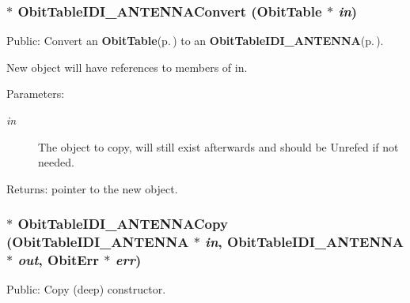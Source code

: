 \subsubsection{$\ast$ Obit\-Table\-IDI\_\-ANTENNAConvert ({\bf Obit\-Table} $\ast$ {\em in})}\label{ObitTableIDI__ANTENNA_8c_a19}


Public: Convert an {\bf Obit\-Table}{\rm (p.\,\pageref{structObitTable})} to an {\bf Obit\-Table\-IDI\_\-ANTENNA}{\rm (p.\,\pageref{structObitTableIDI__ANTENNA})}. 

New object will have references to members of in. \begin{Desc}
\item[Parameters:]
\begin{description}
\item[{\em in}]The object to copy, will still exist afterwards and should be Unrefed if not needed. \end{description}
\end{Desc}
\begin{Desc}
\item[Returns:]pointer to the new object. \end{Desc}
\subsubsection{$\ast$ Obit\-Table\-IDI\_\-ANTENNACopy ({\bf Obit\-Table\-IDI\_\-ANTENNA} $\ast$ {\em in}, {\bf Obit\-Table\-IDI\_\-ANTENNA} $\ast$ {\em out}, {\bf Obit\-Err} $\ast$ {\em err})}\label{ObitTableIDI__ANTENNA_8c_a20}


Public: Copy (deep) constructor. 


